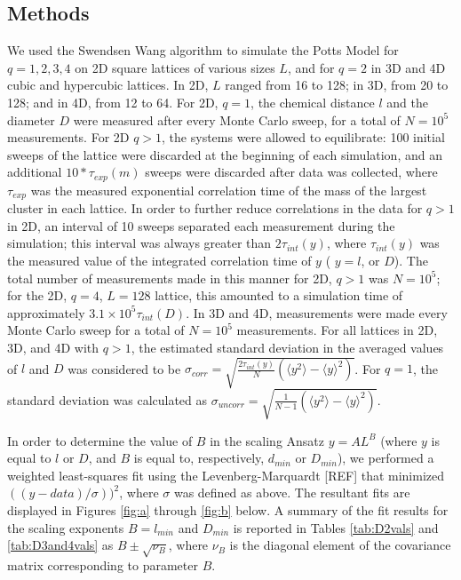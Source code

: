 \documentclass[pre,preprint]{revtex4}
\newcommand{\lb}{{\langle}}
\newcommand{\rb}{{\rangle}}
\begin{document}
\subsection{Methods}

We used the Swendsen Wang algorithm to simulate the Potts Model for $q=1,2,3,4$ on 2D square lattices of various sizes $L$, and for $q=2$ in 3D and 4D cubic and hypercubic lattices.  In 2D, $L$ ranged from 16 to 128; in 3D, from 20 to 128; and in 4D, from 12 to 64. For 2D, $q=1$, the chemical distance $l$ and the diameter $D$ were measured after every Monte Carlo sweep, for a total of $N=10^5$ measurements. For 2D $q>1$, the systems were allowed to equilibrate: 100 initial sweeps of the lattice were discarded at the beginning of each simulation, and an additional $10*\tau_{exp}(m)$ sweeps were discarded after data was collected, where $\tau_{exp}$ was the measured exponential correlation \cite{Ah91} time of the mass of the largest cluster in each lattice. In order to further reduce correlations in the data for $q>1$ in 2D, an interval of 10 sweeps separated each measurement during the simulation; this interval was always greater than $2\tau_{int}(y)$, where $\tau_{int}(y)$ was the measured value of the integrated correlation time of $y$ ( $y=l$, or $D$). The total number of measurements made in this manner for 2D, $q>1$ was $N=10^5$; for the 2D, $q=4$, $L=128$ lattice, this amounted to a simulation time of approximately $3.1 \times 10^5 \tau_{int}(D)$.  In 3D and 4D, measurements were made every Monte Carlo sweep for a total of $N=10^5$ measurements.  For all lattices in 2D, 3D, and 4D with $q>1$, the estimated standard deviation in the averaged values of $l$ and $D$ was considered to be $\sigma_{corr} = \sqrt{ \frac{2 \tau_{int}(y)}{N} (\lb y^2 \rb - \lb y \rb^2)}$.  For $q=1$, the standard deviation was calculated as $\sigma_{uncorr} = \sqrt{ \frac{1}{N-1} (\lb y^2 \rb - \lb y \rb^2)}$.

In order to determine the value of $B$ in the scaling Ansatz $y=AL^{B}$ (where $y$ is equal to $l$ or $D$, and $B$ is equal to, respectively, $d_{min}$ or $D_{min}$), we performed a weighted least-squares fit using the Levenberg-Marquardt [REF] that minimized $((y-data)/\sigma))^2$, where $\sigma$ was defined as above. The resultant fits are displayed in Figures \ref{fig:a} through \ref{fig:b} below.  A summary of the fit results for the scaling exponents $B=l_{min}$ and $D_{min}$ is reported in Tables \ref{tab:D2vals} and \ref{tab:D3and4vals} as $B \pm \sqrt{\nu_B}$, where $\nu_{B}$ is the diagonal element of the covariance matrix corresponding to parameter $B$.
\end{document}
